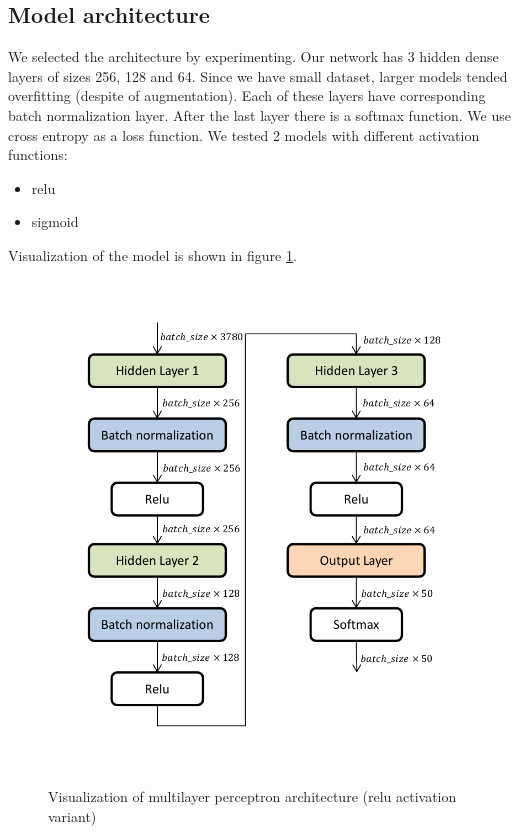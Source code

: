 \documentclass[a4paper]{article}
\begin{document}
\subsection{Model architecture}
We selected the architecture by experimenting.
Our network has 3 hidden dense layers of sizes 256, 128 and 64.
Since we have small dataset, larger models tended overfitting
(despite of augmentation).
Each of these layers have corresponding batch normalization layer.
After the last layer there is a softmax function.
We use cross entropy as a loss function.
We tested 2 models with different activation functions:
\begin{itemize}
    \item relu
    \item sigmoid
\end{itemize}
Visualization of the model is shown in figure \ref{fig:arch}.

\begin{figure}[H]
    \caption[]{Visualization of multilayer perceptron architecture (relu activation variant)}
    \centering
    \includegraphics[page=1,width=1.0\textwidth]{architecture.pdf}
    \label{fig:arch}
\end{figure}
\end{document}
